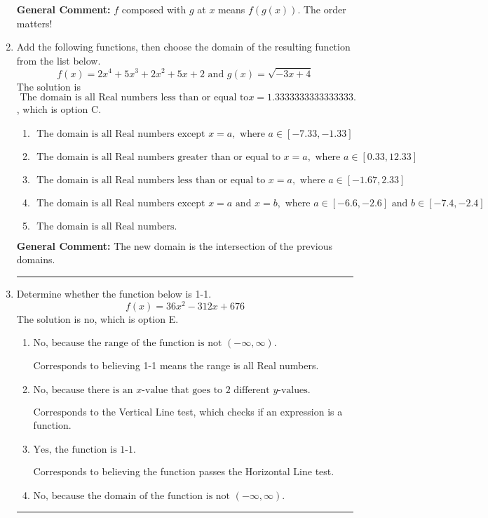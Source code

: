 \documentclass{extbook}[14pt]
\newcommand{\litem}[1]{\item #1

\rule{\textwidth}{0.4pt}}
\begin{document}
\begin{enumerate}
{\textbf{General Comment:} $f$ composed with $g$ at $x$ means $f(g(x))$. The order matters!
}
\litem{
Add the following functions, then choose the domain of the resulting function from the list below.
\[ f(x) = 2x^{4} +5 x^{3} +2 x^{2} +5 x + 2 \text{ and } g(x) = \sqrt{-3x+4}  \]The solution is \( \text{ The domain is all Real numbers less than or equal to} x = 1.3333333333333333. \), which is option C.\begin{enumerate}[label=\Alph*.]
\item \( \text{ The domain is all Real numbers except } x = a, \text{ where } a \in [-7.33, -1.33] \)


\item \( \text{ The domain is all Real numbers greater than or equal to } x = a, \text{ where } a \in [0.33, 12.33] \)


\item \( \text{ The domain is all Real numbers less than or equal to } x = a, \text{ where } a \in [-1.67, 2.33] \)


\item \( \text{ The domain is all Real numbers except } x = a \text{ and } x = b, \text{ where } a \in [-6.6, -2.6] \text{ and } b \in [-7.4, -2.4] \)


\item \( \text{ The domain is all Real numbers. } \)


\end{enumerate}

\textbf{General Comment:} The new domain is the intersection of the previous domains.
}
\litem{
Determine whether the function below is 1-1.
\[ f(x) = 36 x^2 - 312 x + 676 \]The solution is \( \text{no} \), which is option E.\begin{enumerate}[label=\Alph*.]
\item \( \text{No, because the range of the function is not $(-\infty, \infty)$.} \)

Corresponds to believing 1-1 means the range is all Real numbers.
\item \( \text{No, because there is an $x$-value that goes to 2 different $y$-values.} \)

Corresponds to the Vertical Line test, which checks if an expression is a function.
\item \( \text{Yes, the function is 1-1.} \)

Corresponds to believing the function passes the Horizontal Line test.
\item \( \text{No, because the domain of the function is not $(-\infty, \infty)$.} \)


\end{enumerate}}
\end{enumerate}
\end{document}
